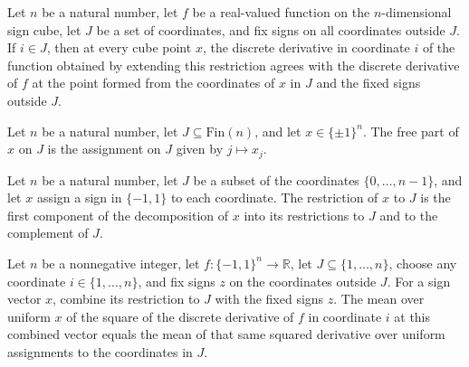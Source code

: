 \begin{theorem}
\label{FABL.discreteDerivative_extendedSignRestriction_of_mem}
\leanok
{}
Let $n$ be a natural number, let $f$ be a real-valued function on the $n$-dimensional
sign cube, let $J$ be a set of coordinates, and fix signs on all coordinates outside
$J$. If $i\in J$, then at every cube point $x$, the discrete derivative in coordinate
$i$ of the function obtained by extending this restriction agrees with the discrete
derivative of $f$ at the point formed from the coordinates of $x$ in $J$ and the fixed
signs outside $J$.
\end{theorem}

\begin{definition}
\label{FABL.freePart}
\leanok
{}
Let $n$ be a natural number, let $J\subseteq\mathrm{Fin}(n)$, and let
$x\in\{\pm1\}^n$. The free part of $x$ on $J$ is the assignment on $J$ given by
$j\mapsto x_j$.
\end{definition}

\begin{theorem}
\label{FABL.freePart_eq_split}
\leanok
{}
Let $n$ be a natural number, let $J$ be a subset of the coordinates $\{0,\ldots,n-1\}$,
and let $x$ assign a sign in $\{-1,1\}$ to each coordinate. The restriction of $x$ to
$J$ is the first component of the decomposition of $x$ into its restrictions to $J$ and
to the complement of $J$.
\end{theorem}

\begin{theorem}
\label{FABL.expect_sq_discreteDerivative_combine}
\leanok
{}
Let $n$ be a nonnegative integer, let $f:\{-1,1\}^n\to\mathbb{R}$, let
$J\subseteq\{1,\ldots,n\}$, choose any coordinate $i\in\{1,\ldots,n\}$, and fix signs
$z$ on the coordinates outside $J$. For a sign vector $x$, combine its restriction to
$J$ with the fixed signs $z$. The mean over uniform $x$ of the square of the discrete
derivative of $f$ in coordinate $i$ at this combined vector equals the mean of that same
squared derivative over uniform assignments to the coordinates in $J$.
\end{theorem}

